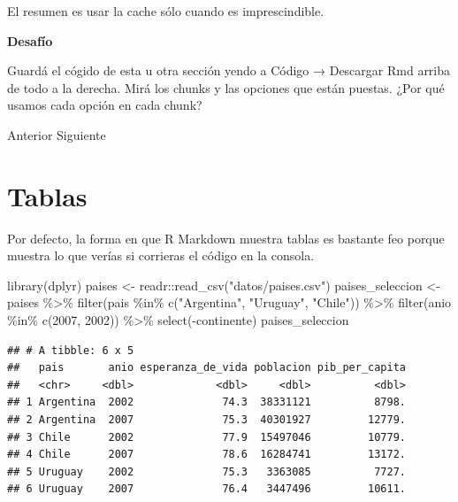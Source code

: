 \documentclass[
  openany]{book}
\newenvironment{Shaded}{\begin{snugshade}}{\end{snugshade}}
\newcommand{\DecValTok}[1]{\textcolor[rgb]{0.00,0.00,0.81}{#1}}
\newcommand{\FunctionTok}[1]{\textcolor[rgb]{0.00,0.00,0.00}{#1}}
\newcommand{\NormalTok}[1]{#1}
\newcommand{\OtherTok}[1]{\textcolor[rgb]{0.56,0.35,0.01}{#1}}
\newcommand{\SpecialCharTok}[1]{\textcolor[rgb]{0.00,0.00,0.00}{#1}}
\newcommand{\StringTok}[1]{\textcolor[rgb]{0.31,0.60,0.02}{#1}}
\begin{document}
El resumen es usar la cache sólo cuando es imprescindible.

\textbf{Desafío}

Guardá el cógido de esta u otra sección yendo a Código → Descargar Rmd arriba de todo a la derecha. Mirá los chunks y las opciones que están puestas. ¿Por qué usamos cada opción en cada chunk?

Anterior
Siguiente

\hypertarget{tablas}{%
\section{Tablas}\label{tablas}}

Por defecto, la forma en que R Markdown muestra tablas es bastante feo porque muestra lo que verías si corrieras el código en la consola.

\begin{Shaded}
\begin{Highlighting}[]
\FunctionTok{library}\NormalTok{(dplyr)}
\NormalTok{paises }\OtherTok{\textless{}{-}}\NormalTok{ readr}\SpecialCharTok{::}\FunctionTok{read\_csv}\NormalTok{(}\StringTok{"datos/paises.csv"}\NormalTok{)}
\NormalTok{paises\_seleccion }\OtherTok{\textless{}{-}}\NormalTok{ paises }\SpecialCharTok{\%\textgreater{}\%} 
  \FunctionTok{filter}\NormalTok{(pais }\SpecialCharTok{\%in\%} \FunctionTok{c}\NormalTok{(}\StringTok{"Argentina"}\NormalTok{, }\StringTok{"Uruguay"}\NormalTok{, }\StringTok{"Chile"}\NormalTok{)) }\SpecialCharTok{\%\textgreater{}\%} 
  \FunctionTok{filter}\NormalTok{(anio }\SpecialCharTok{\%in\%} \FunctionTok{c}\NormalTok{(}\DecValTok{2007}\NormalTok{, }\DecValTok{2002}\NormalTok{)) }\SpecialCharTok{\%\textgreater{}\%}
  \FunctionTok{select}\NormalTok{(}\SpecialCharTok{{-}}\NormalTok{continente)}
\NormalTok{paises\_seleccion}
\end{Highlighting}
\end{Shaded}

\begin{verbatim}
## # A tibble: 6 x 5
##   pais       anio esperanza_de_vida poblacion pib_per_capita
##   <chr>     <dbl>             <dbl>     <dbl>          <dbl>
## 1 Argentina  2002              74.3  38331121          8798.
## 2 Argentina  2007              75.3  40301927         12779.
## 3 Chile      2002              77.9  15497046         10779.
## 4 Chile      2007              78.6  16284741         13172.
## 5 Uruguay    2002              75.3   3363085          7727.
## 6 Uruguay    2007              76.4   3447496         10611.
\end{verbatim}
\end{document}
